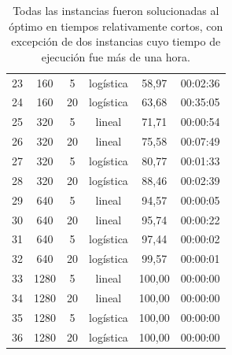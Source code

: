 \begin{table}
\begin{tabular}{SSScSc}
      23 & 160 & 5 & logística & 58,97 & 00:02:36 \\
      24 & 160 & 20 & logística & 63,68 & 00:35:05 \\
      25 & 320 & 5 & lineal & 71,71 & 00:00:54 \\
      26 & 320 & 20 & lineal & 75,58 & 00:07:49 \\
      27 & 320 & 5 & logística & 80,77 & 00:01:33 \\
      28 & 320 & 20 & logística & 88,46 & 00:02:39 \\
      29 & 640 & 5 & lineal & 94,57 & 00:00:05 \\
      30 & 640 & 20 & lineal & 95,74 & 00:00:22 \\
      31 & 640 & 5 & logística & 97,44 & 00:00:02 \\
      32 & 640 & 20 & logística & 99,57 & 00:00:01 \\
      33 & 1280 & 5 & lineal & 100,00 & 00:00:00 \\
      34 & 1280 & 20 & lineal & 100,00 & 00:00:00 \\
      35 & 1280 & 5 & logística & 100,00 & 00:00:00 \\
      36 & 1280 & 20 & logística & 100,00 & 00:00:00 \\
    \bottomrule
  \end{tabular}
  \caption{Todas las instancias fueron solucionadas al óptimo en tiempos relativamente cortos, con excepción de dos instancias cuyo tiempo de ejecución fue más de una hora.} \label{table:sensibilityresults}
\end{table}

